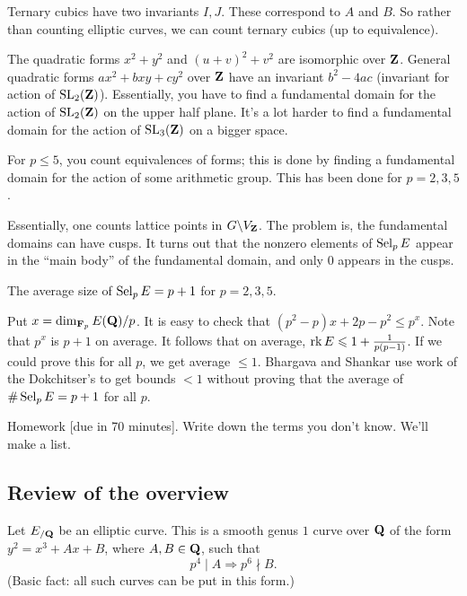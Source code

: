 Ternary cubics have two invariants $I,J$. These correspond to $A$ and $B$. So 
rather than counting elliptic curves, we can count ternary cubics (up to 
equivalence). 

The quadratic forms $x^2+y^2$ and $(u+v)^2+v^2$ are isomorphic over $\mathbf{Z}$. 
General quadratic forms $a x^2+b x y+c y^2$ over $\mathbf{Z}$ have an invariant 
$b^2-4 a c$ (invariant for action of $\operatorname{SL}_2(\mathbf{Z})$). Essentially, you have 
to find a fundamental domain for the action of $\operatorname{SL}_2(\mathbf{Z})$ on the upper 
half plane. It's a lot harder to find a fundamental domain for the action 
of $\operatorname{SL}_3(\mathbf{Z})$ on a bigger space. 

For $p\leqslant 5$, you count equivalences of forms; this is done by 
finding a fundamental domain for the action of some arithmetic group. 
This has been done for $p=2,3,5$. 

Essentially, one counts lattice points in $G\backslash V_{\mathbf{Z}}$. The problem 
is, the fundamental domains can have cusps. It turns out that the 
nonzero elements of $\operatorname{Sel}_p E$ appear in the ``main body'' of the 
fundamental domain, and only $0$ appears in the cusps. 

\begin{theorem}
The average size of $\operatorname{Sel}_p E=p+1$ for $p=2,3,5$. 
\end{theorem}

Put $x=\dim_{\mathbf{F}_p} E(\mathbf{Q})/p$. It is easy to check that 
$(p^2-p) x+2 p-p^2 \leqslant p^x$. Note that $p^x$ is $p+1$ on average. 
It follows that on average, $\operatorname{rk} E\leqslant 1+\frac{1}{p(p-1)}$. 
If we could prove this for all $p$, we get average $\leqslant 1$. Bhargava 
and Shankar use work of the Dokchitser's to get bounds $<1$ without proving 
that the average of $\#\operatorname{Sel}_p E=p+1$ for all $p$. 





Homework [due in 70 minutes]. Write down the terms you don't know. We'll make a 
list. 





\subsection{Review of the overview}

Let $E_{/\mathbf{Q}}$ be an elliptic curve. This is a smooth genus $1$ curve over 
$\mathbf{Q}$ of the form $y^2=x^3+A x+B$, where $A,B\in \mathbf{Q}$, such that 
\[
  p^4\mid A\Rightarrow p^6\nmid B .
\]
(Basic fact: all such curves can be put in this form.)

